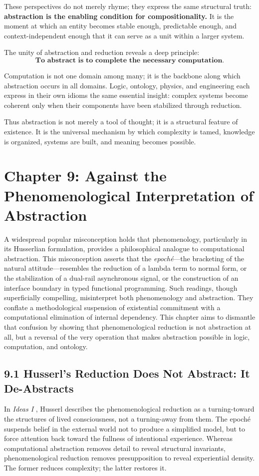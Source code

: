 \documentclass[11pt,letterpaper]{article}
\begin{document}
These perspectives do not merely rhyme; they express the same structural truth: \textbf{abstraction is the enabling condition for compositionality.} It is the moment at which an entity becomes stable enough, predictable enough, and context-independent enough that it can serve as a unit within a larger system.

The unity of abstraction and reduction reveals a deep principle:
\[
\textbf{To abstract is to complete the necessary computation.}
\]

Computation is not one domain among many; it is the backbone along which abstraction occurs in all domains. Logic, ontology, physics, and engineering each express in their own idioms the same essential insight: complex systems become coherent only when their components have been stabilized through reduction.

Thus abstraction is not merely a tool of thought; it is a structural feature of existence. It is the universal mechanism by which complexity is tamed, knowledge is organized, systems are built, and meaning becomes possible.

\newpage

\section{Chapter 9: Against the Phenomenological Interpretation of Abstraction}

A widespread popular misconception holds that phenomenology, particularly in its Husserlian formulation, provides a philosophical analogue to computational abstraction. This misconception asserts that the \emph{epoché}—the bracketing of the natural attitude—resembles the reduction of a lambda term to normal form, or the stabilization of a dual-rail asynchronous signal, or the construction of an interface boundary in typed functional programming. Such readings, though superficially compelling, misinterpret both phenomenology and abstraction. They conflate a methodological suspension of existential commitment with a computational elimination of internal dependency. This chapter aims to dismantle that confusion by showing that phenomenological reduction is not abstraction at all, but a reversal of the very operation that makes abstraction possible in logic, computation, and ontology.

\subsection{9.1 Husserl’s Reduction Does Not Abstract: It De-Abstracts}
In \textit{Ideas I} \parencite{Husserl1913}, Husserl describes the phenomenological reduction as a turning-toward the structures of lived consciousness, not a turning-away from them. The epoché suspends belief in the external world not to produce a simplified model, but to force attention back toward the fullness of intentional experience. Whereas computational abstraction removes detail to reveal structural invariants, phenomenological reduction removes presupposition to reveal experiential density. The former reduces complexity; the latter restores it.
\end{document}
